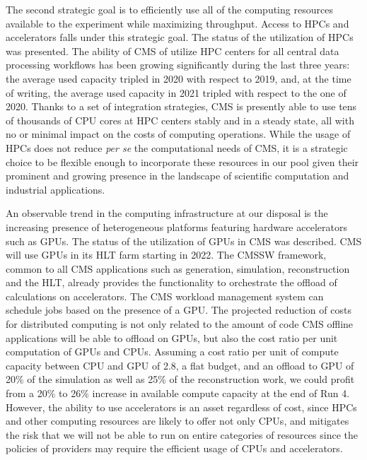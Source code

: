 \documentclass{cmspaper}
\begin{document}
The second strategic goal is to efficiently use all of the computing resources available to the experiment while maximizing throughput. Access to HPCs and accelerators falls under this strategic goal.
The status of the utilization of HPCs was presented. The ability of CMS of utilize HPC centers for all central data processing workflows has been growing significantly during the last three years: the average used capacity tripled in 2020 with respect to 2019, and, at the time of writing, the average used capacity in 2021 tripled with respect to the one of 2020.
Thanks to a set of integration strategies, CMS is presently able to use tens of thousands of CPU cores at HPC centers stably and in a steady state, all with no or minimal impact on the costs of computing operations.
While the usage of HPCs does not reduce \textit{per se} the computational needs of CMS, it is a strategic choice to be flexible enough to incorporate these resources in our pool given their prominent and growing presence in the landscape of scientific computation and industrial applications.

An observable trend in the computing infrastructure at our disposal is the increasing presence of heterogeneous platforms featuring hardware accelerators such as GPUs. The status of the utilization of GPUs in CMS was described. CMS will use GPUs in its HLT farm starting in 2022. The CMSSW framework, common to all CMS applications such as generation, simulation, reconstruction and the HLT, already provides the functionality to orchestrate the offload of calculations on accelerators. The CMS workload management system can schedule jobs based on the presence of a GPU. The projected reduction of costs for distributed computing is not only related to the amount of code CMS offline applications will be able to offload on GPUs, but also the cost ratio per unit computation of GPUs and CPUs. Assuming a cost ratio per unit of compute capacity between CPU and GPU of 2.8, a flat budget, and an offload to GPU of 20\% of the simulation as well as 25\% of the reconstruction work, we could profit from a 20\% to 26\% increase in available compute capacity at the end of Run 4.
However, the ability to use accelerators is an asset regardless of cost, since HPCs and other computing resources are likely to offer not only CPUs, and mitigates the risk that we will not be able to run on entire categories of resources since the policies of providers may require the efficient usage of CPUs and accelerators.
\end{document}
